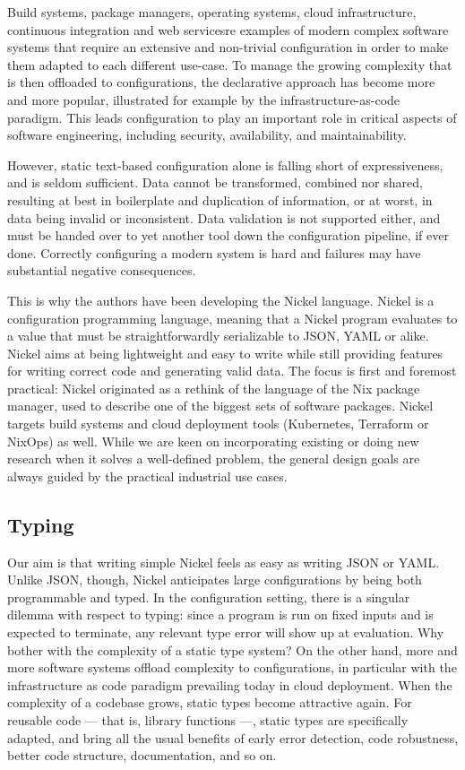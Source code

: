 \documentclass[sigplan,10pt,review,anonymous]{acmart}
\newcommand{\resolved}[2]{}
\begin{document}
Build systems, package managers, operating systems, cloud infrastructure,
continuous integration and web services\resolved{Also continuous integration}
are examples of modern complex software systems that require an extensive and
non-trivial configuration in order to make them adapted to each different
use-case. To manage the growing complexity that is then offloaded to
configurations, the declarative approach has become more and more popular,
illustrated for example by the infrastructure-as-code paradigm. This leads
configuration to play an important role in critical aspects of software
engineering, including security, availability, and maintainability.

However, static text-based configuration alone is falling short of
expressiveness, and is seldom sufficient. Data cannot be transformed, combined
nor shared, resulting at best in boilerplate and duplication of information, or
at worst, in data being invalid or inconsistent. Data validation is not
supported either, and must be handed over to yet another tool down the
configuration pipeline, if ever done. Correctly configuring a modern system is
hard and failures may have substantial negative consequences.

This is why the authors have been developing the Nickel
language\cite{NickelRepo}. Nickel is a configuration programming language,
meaning that a Nickel program evaluates to a value that must be
straightforwardly serializable to JSON, YAML or alike. Nickel aims at being
lightweight and easy to write while still providing features for writing correct
code and generating valid data. The focus is first and foremost practical:
Nickel originated as a rethink of the language of the Nix package manager, used
to describe one of the biggest sets of software packages\cite{repology}.  Nickel
targets build systems and cloud deployment tools (Kubernetes, Terraform or
NixOps) as well. While we are keen on incorporating existing or doing new
research when it solves a well-defined problem, the general design goals are
always guided by the practical industrial use cases.

\subsection{Typing}

Our aim is that writing simple Nickel feels as easy as writing JSON or YAML.
Unlike JSON, though, Nickel anticipates large configurations by being both
programmable and typed. In the configuration setting, there is a singular
dilemma with respect to typing: since a program is run on fixed inputs and is
expected to terminate, any relevant type error will show up at evaluation.  Why
bother with the complexity of a static type system? On the other hand, more and
more software systems offload complexity to configurations, in particular with
the infrastructure as code paradigm prevailing today in cloud deployment. When
the complexity of a codebase grows, static types become attractive again.  For
reusable code — that is, library functions —, static types are specifically
adapted, and bring all the usual benefits of early error detection, code
robustness, better code structure, documentation, and so on.
\end{document}
